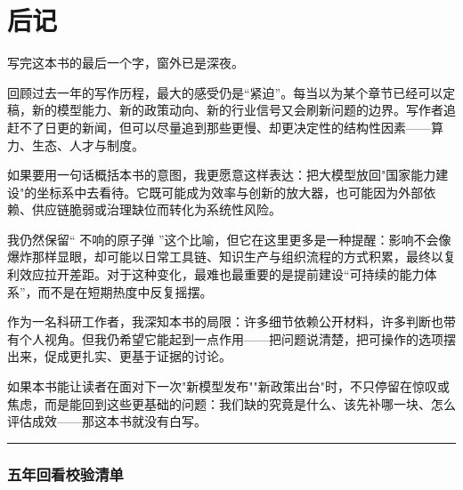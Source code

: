 \chapter*{后\quad 记}

写完这本书的最后一个字，窗外已是深夜。

回顾过去一年的写作历程，最大的感受仍是“紧迫”。每当以为某个章节已经可以定稿，新的模型能力、新的政策动向、新的行业信号又会刷新问题的边界。写作者追赶不了日更的新闻，但可以尽量追到那些更慢、却更决定性的结构性因素——算力、生态、人才与制度。

如果要用一句话概括本书的意图，我更愿意这样表达：把大模型放回"国家能力建设"的坐标系中去看待。它既可能成为效率与创新的放大器，也可能因为外部依赖、供应链脆弱或治理缺位而转化为系统性风险。

我仍然保留“\,\,不响的原子弹\,\,”这个比喻，但它在这里更多是一种提醒：影响不会像爆炸那样显眼，却可能以日常工具链、知识生产与组织流程的方式积累，最终以复利效应拉开差距。对于这种变化，最难也最重要的是提前建设“可持续的能力体系”，而不是在短期热度中反复摇摆。

作为一名科研工作者，我深知本书的局限：许多细节依赖公开材料，许多判断也带有个人视角。但我仍希望它能起到一点作用——把问题说清楚，把可操作的选项摆出来，促成更扎实、更基于证据的讨论。

如果本书能让读者在面对下一次"新模型发布""新政策出台"时，不只停留在惊叹或焦虑，而是能回到这些更基础的问题：我们缺的究竟是什么、该先补哪一块、怎么评估成效——那这本书就没有白写。

\bigskip
\noindent\rule{\textwidth}{0.4pt}

\subsection*{五年回看校验清单}

